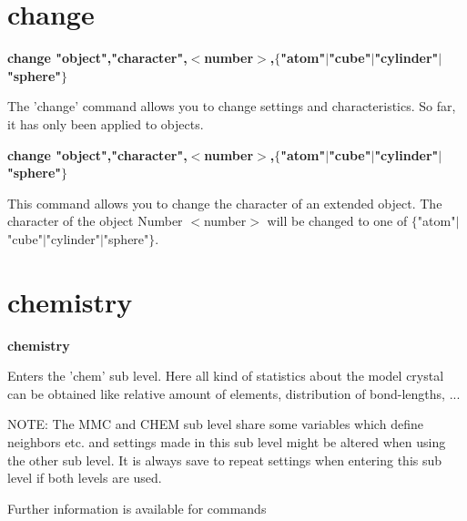 \section{change}
{\bf change "object","character",$ <$number$> $,$ \{$"atom"$| $"cube"$| $"cylinder"$| $"sphere"$\} $ \par }
\par
\vspace{3pt}
The 'change' command allows you to change settings and characteristics. 
So far, it has only been applied to objects. 
\par
{\bf change "object","character",$ <$number$> $,$ \{$"atom"$| $"cube"$| $"cylinder"$| $"sphere"$\} $ \par }
\par
\vspace{3pt}
This command allows you to change the character of an extended 
object. The character of the object Number $ <$number$> $ will be changed 
to one of $ \{$"atom"$| $"cube"$| $"cylinder"$| $"sphere"$\} $. 
\section{chemistry}
{\bf chemistry \par }
\par
\vspace{3pt}
Enters the 'chem' sub level. Here all kind of statistics about the 
model crystal can be obtained like relative amount of elements, 
distribution of bond-lengths, ... 
\par
NOTE: The MMC and CHEM sub level share some variables which define 
      neighbors etc. and settings made in this sub level might be 
      altered when using the other sub level. It is always save to 
      repeat settings when entering this sub level if both levels 
      are used. 
\par
Further information is available for commands 
\par
